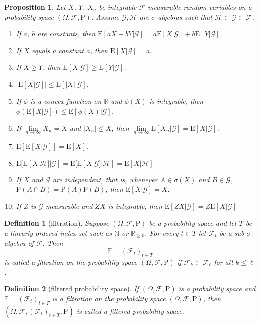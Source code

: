 \documentclass{article}
\newtheorem{definition}{Definition}[section]
\newtheorem{proposition}{Proposition}[section]
\theoremstyle{nonumberplain}
\begin{document}
\begin{proposition}
	Let $X$, $Y$, $X_n$ be integrable $\mathcal{F}$-measurable random variables on a probability space $(\Omega,\mathcal{F},\mathrm{P})$. Assume  $\mathcal{G},\mathcal{H}$ are $\sigma$-algebras such that $\mathcal{H}\subset\mathcal{G}\subset\mathcal{F}$.
	\begin{enumerate}  
		\item If $a$, $b$ are constants, then $\mathrm{E}[aX+bY|\mathcal{G}]=a\mathrm{E}[X|\mathcal{G}]+b\mathrm{E}[Y|\mathcal{G}]$.
		\item If $X$ equals a constant $a$, then $\mathrm{E}[X|\mathcal{G}]=a$.
		\item If $X\ge Y$,  then $\mathrm{E}[X|\mathcal{G}]\ge\mathrm{E}[Y|\mathcal{G}]$.
		\item $\left|\mathrm{E}[X|\mathcal{G}]\right|\le\mathrm{E}[\left|X\right||\mathcal{G}]$.
		\item If $\phi$ is a convex function on $\mathbb{R}$ and $\phi(X)$ is integrable, then $\phi(\mathrm{E}[X|\mathcal{G}])\le\mathrm{E}[\phi(X)|\mathcal{G}]$.
		\item If $\lim\limits_{n\to\infty}X_n=X$ and $|X_n|\le X$, then $\lim\limits_{n\to\infty}\mathrm{E}[X_n|\mathcal{G}]=\mathrm{E}[X|\mathcal{G}]$.
		\item $\mathrm{E}[\mathrm{E}[X|\mathcal{G}]]=\mathrm{E}[X]$.
		\item $\mathrm{E}[\mathrm{E}[X|\mathcal{H}]|\mathcal{G}]=\mathrm{E}[\mathrm{E}[X|\mathcal{G}]|\mathcal{H}]=\mathrm{E}[X|\mathcal{H}]$
		\item If $X$ and $\mathcal{G}$ are independent, that is, whenever $A\in\sigma(X)$ and $B\in\mathcal{G}$, $\mathrm{P}(A\cap B)= \mathrm{P}(A) \mathrm{P}(B)$, then $\mathrm{E}[X|\mathcal{G}]=X$.
		\item If $Z$ is $\mathcal{G}$-measurable and $ZX$ is integrable, then $\mathrm{E}[ZX|\mathcal{G}]=Z\mathrm{E}[X|\mathcal{G}]$
	\end{enumerate}
\end{proposition}
\begin{definition}[filtration]
Suppose $(\Omega,\mathcal{F},\mathrm{P})$ be a probability space and let $T$ be a linearly ordered index set such as $\mathbb{N}$ or $\mathbb{R}_{\ge 0}$. For every $t\in T$ let $\mathcal{F}_{t}$ be a sub-$\sigma$-algebra of $\mathcal{F}$. Then
\[
\mathbb{F} =(\mathcal{F}_{t})_{t\in T}
\]
is called a \emph{filtration} on the probability space $(\Omega,\mathcal{F},\mathrm{P})$ if $\mathcal {F}_{k}\subset \mathcal{F}_{\ell}$ for all $k\leq \ell$. 
\end{definition}
\begin{definition}[filtered probability space]
	If $(\Omega,\mathcal{F},\mathrm{P})$ is a probability space and $ \mathbb {F}=(\mathcal{F}_{t})_{t\in T }$ is a filtration on the probability space $(\Omega,\mathcal{F},\mathrm{P})$, then $(\Omega,\mathcal{F},(\mathcal{F}_{t})_{t\in T },\mathrm{P})$ is called a \emph{filtered probability space}.
\end{definition}
\end{document}
